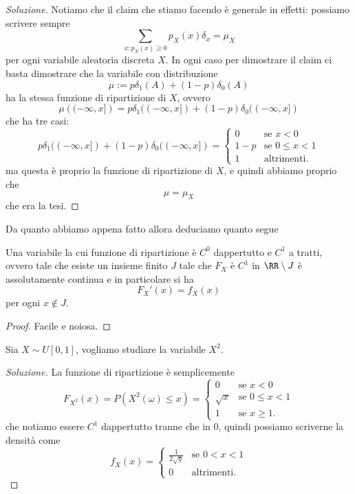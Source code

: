 \documentclass[11pt]{scrartcl}
\begin{document}
	\begin{proof}[Soluzione]
		Notiamo che il claim che stiamo facendo è generale in effetti: possiamo scrivere sempre
		$$\sum_{x:p_X(x)\ge 0}p_X(x)\delta_x=\mu_X$$
		per ogni variabile aleatoria discreta $X$. In ogni caso per dimostrare il claim ci basta dimostrare che la variabile con distribuzione
		$$\mu:=p\delta_1(A)+(1-p)\delta_0(A)$$
		ha la stessa funzione di ripartizione di $X$, ovvero
		$$\mu\left((-\infty,x]\right)=p\delta_1((-\infty,x])+(1-p)\delta_0((-\infty,x])$$
		che ha tre casi:
		$$p\delta_1((-\infty,x])+(1-p)\delta_0((-\infty,x])=
		\begin{cases}
			0 & \text{se $x<0$} \\
			1-p & \text{se $0\le x<1$} \\
			1 & \text{altrimenti.}
		\end{cases}$$
		ma questa è proprio la funzione di ripartizione di $X$, e quindi abbiamo proprio che 
		$$\mu=\mu_X$$
		che era la tesi.
	\end{proof}
	Da quanto abbiamo appena fatto allora deduciamo quanto segue
	\begin{proposition}
		Una variabile la cui funzione di ripartizione è $C^0$ dappertutto e $C^1$ a tratti, ovvero tale che esiste un insieme finito $J$ tale che $F_X$ è $C^1$ in $\RR\setminus J$ è assolutamente continua e in particolare si ha
		$$F_X'(x)=f_X(x)$$
		per ogni $x\not\in J$.
	\end{proposition}
	\begin{proof}
		Facile e noiosa.
	\end{proof}
	\begin{example}
		Sia $X\sim U[0,1]$, vogliamo studiare la variabile $X^2$.
	\end{example}
	\begin{proof}[Soluzione]
		La funzione di ripartizione è semplicemente
		$$F_{X^2}(x)=P(X^2(\omega)\le x)=
		\begin{cases}
			0 & \text{se $x<0$} \\
			\sqrt{x} & \text{se $0\le x<1$} \\
			1 & \text{se $x\ge 1$.}
		\end{cases}
		$$
		che notiamo essere $C^1$ dappertutto tranne che in $0$, quindi possiamo scriverne la densità come
		$$f_X(x)=
		\begin{cases}
			\frac{1}{2\sqrt{y}} & \text{se $0<x< 1$} \\
			0 & \text{altrimenti.} 
		\end{cases}$$
	\end{proof}
\end{document}
